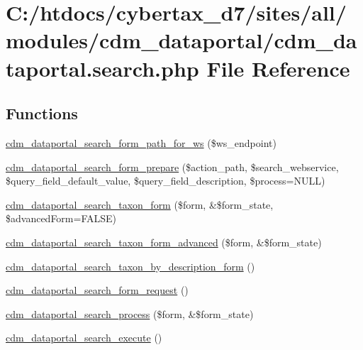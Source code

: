 \hypertarget{cdm__dataportal_8search_8php}{\section{C\-:/htdocs/cybertax\-\_\-d7/sites/all/modules/cdm\-\_\-dataportal/cdm\-\_\-dataportal.search.\-php File Reference}
\label{cdm__dataportal_8search_8php}
}
\subsection*{Functions}
\begin{DoxyCompactItemize}
\item 
\hyperlink{cdm__dataportal_8search_8php_aa6bad6c8d9e823292ccae452c1a1c83c}{cdm\-\_\-dataportal\-\_\-search\-\_\-form\-\_\-path\-\_\-for\-\_\-ws} (\$ws\-\_\-endpoint)
\item 
\hyperlink{cdm__dataportal_8search_8php_a7392d35974969116c8cb946ebf66ce47}{cdm\-\_\-dataportal\-\_\-search\-\_\-form\-\_\-prepare} (\$action\-\_\-path, \$search\-\_\-webservice, \$query\-\_\-field\-\_\-default\-\_\-value, \$query\-\_\-field\-\_\-description, \$process=N\-U\-L\-L)
\item 
\hyperlink{cdm__dataportal_8search_8php_af22aba84981842e3921ad032b405c0cb}{cdm\-\_\-dataportal\-\_\-search\-\_\-taxon\-\_\-form} (\$form, \&\$form\-\_\-state, \$advanced\-Form=F\-A\-L\-S\-E)
\item 
\hyperlink{cdm__dataportal_8search_8php_a423e571230961ee67f89cadf7f221493}{cdm\-\_\-dataportal\-\_\-search\-\_\-taxon\-\_\-form\-\_\-advanced} (\$form, \&\$form\-\_\-state)
\item 
\hyperlink{cdm__dataportal_8search_8php_aab01bbe2184eb69661b28772206ed5aa}{cdm\-\_\-dataportal\-\_\-search\-\_\-taxon\-\_\-by\-\_\-description\-\_\-form} ()
\item 
\hyperlink{cdm__dataportal_8search_8php_ac5b5523ae336e57fc99f6892028d7e6b}{cdm\-\_\-dataportal\-\_\-search\-\_\-form\-\_\-request} ()
\item 
\hyperlink{cdm__dataportal_8search_8php_aa11304aadf0b08ee128fb5618f7e0f74}{cdm\-\_\-dataportal\-\_\-search\-\_\-process} (\$form, \&\$form\-\_\-state)
\item 
\hyperlink{cdm__dataportal_8search_8php_a323826267b052894f83f1fa11b7eced2}{cdm\-\_\-dataportal\-\_\-search\-\_\-execute} ()
\end{DoxyCompactItemize}


